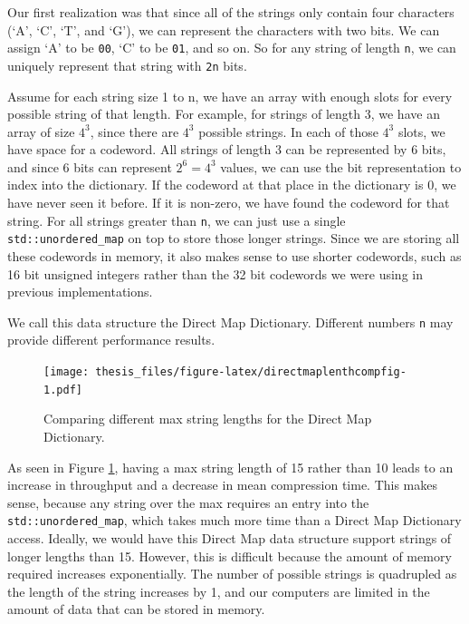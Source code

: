 \documentclass[12pt,twoside]{reedthesis}
\begin{document}
Our first realization was that since all of the strings only contain four characters (`A', `C', `T', and `G'), we can represent the characters with two bits. We can assign `A' to be \texttt{00}, `C' to be \texttt{01}, and so on. So for any string of length \texttt{n}, we can uniquely represent that string with \texttt{2n} bits.

Assume for each string size 1 to n, we have an array with enough slots for every possible string of that length. For example, for strings of length 3, we have an array of size \(4^3\), since there are \(4^3\) possible strings. In each of those \(4^3\) slots, we have space for a codeword. All strings of length 3 can be represented by 6 bits, and since 6 bits can represent \(2^6=4^3\) values, we can use the bit representation to index into the dictionary. If the codeword at that place in the dictionary is 0, we have never seen it before. If it is non-zero, we have found the codeword for that string. For all strings greater than \texttt{n}, we can just use a single \texttt{std::unordered\_map} on top to store those longer strings. Since we are storing all these codewords in memory, it also makes sense to use shorter codewords, such as 16 bit unsigned integers rather than the 32 bit codewords we were using in previous implementations.

We call this data structure the Direct Map Dictionary. Different numbers \texttt{n} may provide different performance results.
\begin{figure}
\centering
\texttt{[image: thesis\_files/figure-latex/directmaplenthcompfig-1.pdf]}
\caption{\label{fig:directmaplenthcompfig}Comparing different max string lengths for the Direct Map Dictionary.}
\end{figure}
As seen in Figure \ref{fig:directmaplenthcompfig}, having a max string length of 15 rather than 10 leads to an increase in throughput and a decrease in mean compression time. This makes sense, because any string over the max requires an entry into the \texttt{std::unordered\_map}, which takes much more time than a Direct Map Dictionary access. Ideally, we would have this Direct Map data structure support strings of longer lengths than 15. However, this is difficult because the amount of memory required increases exponentially. The number of possible strings is quadrupled as the length of the string increases by 1, and our computers are limited in the amount of data that can be stored in memory.
\end{document}
